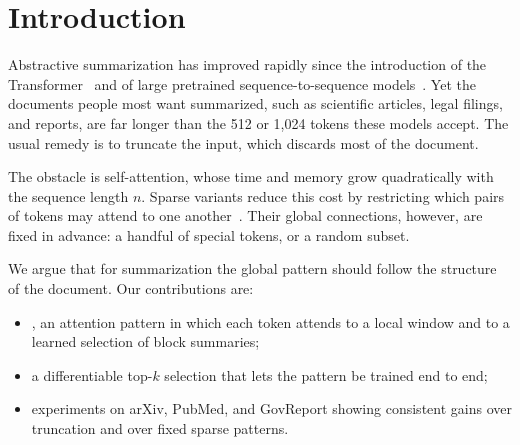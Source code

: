 \section{Introduction}
\label{sec:introduction}

Abstractive summarization has improved rapidly since the introduction of the Transformer~\citep{vaswani2017attention} and of large pretrained sequence-to-sequence models~\citep{lewis2020bart}. Yet the documents people most want summarized, such as scientific articles, legal filings, and reports, are far longer than the 512 or 1{,}024 tokens these models accept. The usual remedy is to truncate the input, which discards most of the document.

The obstacle is self-attention, whose time and memory grow quadratically with the sequence length $n$. Sparse variants reduce this cost by restricting which pairs of tokens may attend to one another~\citep{beltagy2020longformer, zaheer2020bigbird}. Their global connections, however, are fixed in advance: a handful of special tokens, or a random subset.

We argue that for summarization the global pattern should follow the structure of the document. Our contributions are:
\begin{itemize}
  \item \model{}, an attention pattern in which each token attends to a local window and to a learned selection of block summaries;
  \item a differentiable top-$k$ selection that lets the pattern be trained end to end;
  \item experiments on arXiv, PubMed, and GovReport showing consistent gains over truncation and over fixed sparse patterns.
\end{itemize}
